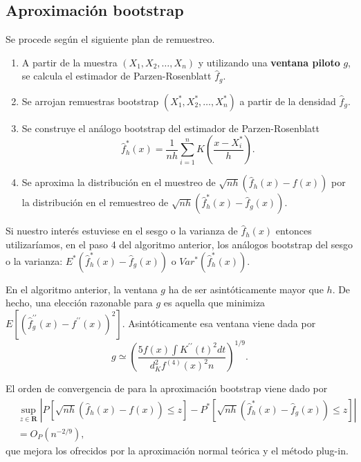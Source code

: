 \documentclass[]{book}
\theoremstyle{break}
\theoremstyle{definition}
\theoremstyle{definition}
\theoremstyle{definition}
\theoremstyle{remark}
\begin{document}
\subsection{Aproximación bootstrap}\label{aproximaciuxf3n-bootstrap}

Se procede según el siguiente plan de remuestreo.

\begin{enumerate}
\def\labelenumi{\arabic{enumi}.}
\item
  A partir de la muestra \(\left( X_1,X_2,\ldots ,X_n \right)\) y
  utilizando una \textbf{ventana piloto} \(g\), se calcula el estimador
  de Parzen-Rosenblatt \(\hat{f}_{g}\).
\item
  Se arrojan remuestras bootstrap
  \(\left( X_1^{\ast},X_2^{\ast },\ldots ,X_n^{\ast} \right)\) a partir
  de la densidad \(\hat{f}_{g}\).
\item
  Se construye el análogo bootstrap del estimador de Parzen-Rosenblatt
  \[\hat{f}_{h}^{\ast}\left( x \right) =\frac{1}{nh}\sum_{i=1}^{n}K\left( \frac{
  x-X_i^{\ast}}{h} \right).\]
\item
  Se aproxima la distribución en el muestreo de
  \(\sqrt{nh}\left( \hat{f}_{h}\left( x \right) -f\left( x \right) \right)\)
  por la distribución en el remuestreo de
  \(\sqrt{nh}\left( \hat{f}_{h}^{\ast}\left( x \right) - \hat{f}_{g}\left( x \right) \right)\).
\end{enumerate}

Si nuestro interés estuviese en el sesgo o la varianza de
\(\hat{f} _{h}\left( x \right)\) entonces utilizaríamos, en el paso 4
del algoritmo anterior, los análogos bootstrap del sesgo o la varianza:
\(E^{\ast}\left( \hat{f}_{h}^{\ast }\left( x \right) -\hat{f}_{g}\left( x \right) \right)\)
o \(Var^{\ast}\left( \hat{f}_{h}^{\ast}\left( x \right) \right)\).

En el algoritmo anterior, la ventana \(g\) ha de ser asintóticamente
mayor que \(h\). De hecho, una elección razonable para \(g\) es aquella
que minimiza
\(E\left[ \left( \hat{f}_{g}^{\prime \prime }\left( x \right) -f^{\prime \prime }\left( x \right) \right)^2\right]\).
Asintóticamente esa ventana viene dada por
\[g\simeq \left( \frac{5f\left( x \right) \int K^{\prime \prime }\left( t
\right)^2dt}{d_{K}^2f^{\left( 4 \right)}\left( x \right)^2n} \right)^{1/9}.\]

El orden de convergencia de para la aproximación bootstrap viene dado
por \[\begin{aligned}
&\sup_{z\in \boldsymbol{R}}\left\vert P\left[ \sqrt{nh}\left( \hat{f}
_{h}\left( x \right) -f\left( x \right) \right) \leq z\right] -P^{\ast}\left[ 
\sqrt{nh}\left( \hat{f}_{h}^{\ast}\left( x \right) -\hat{f}_{g}\left(
x \right) \right) \leq z\right] \right\vert \\
&= O_{P}\left( n^{-2/9} \right),\end{aligned}\]que mejora los ofrecidos
por la aproximación normal teórica y el método plug-in.
\end{document}
